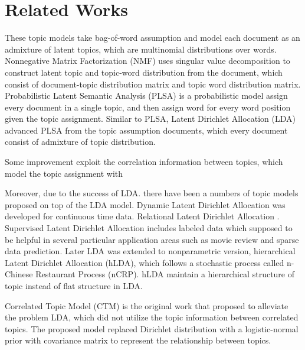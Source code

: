\section{Related Works}\label{AB}
These topic models take bag-of-word assumption and model each document as an admixture of latent topics, which are multinomial distributions over words.
Nonnegative Matrix Factorization (NMF) \cite{bibid} uses singular value decomposition to construct latent topic and topic-word distribution from the document, which consist of document-topic distribution matrix and topic word distribution matrix.
Probabilistic Latent Semantic Analysis (PLSA) \cite{hofmann_probabilistic_2013} is a probabilistic model assign every document in a single topic, and then assign word for every word position given the topic assignment.
Similar to PLSA, Latent Dirichlet Allocation (LDA) \cite{blei_latent_2003} advanced PLSA from the topic assumption documents, which every document consist of admixture of topic distribution.

Some improvement exploit the correlation information between topics, which model the topic assignment with 

Moreover, due to the  success of LDA. there have been a numbers of topic models proposed on top of the LDA model. Dynamic Latent Dirichlet Allocation\cite{blei_probabilistic_2012} was developed for continuous time data. Relational Latent Dirichlet Allocation \cite{chang_relational_nodate} . Supervised Latent Dirichlet Allocation \cite{mcauliffe_supervised_2008} includes labeled data which supposed to be helpful in several particular application areas such as movie review and sparse data prediction. Later LDA was extended to nonparametric version, hierarchical Latent Dirichlet Allocation (hLDA)\cite{teh_hierarchical_2006}, which follows a stochastic process called n-Chinese Restaurant Process (nCRP)\cite{teh_tutorial_nodate}. hLDA maintain a hierarchical structure of topic instead of flat structure in LDA. %

Correlated Topic Model (CTM)\cite{blei_correlated_2007} is the original work that proposed to alleviate the problem LDA, which did not utilize the topic information between correlated topics. The proposed model replaced Dirichlet distribution with a logistic-normal prior with covariance matrix to represent the relationship between topics.
% 

